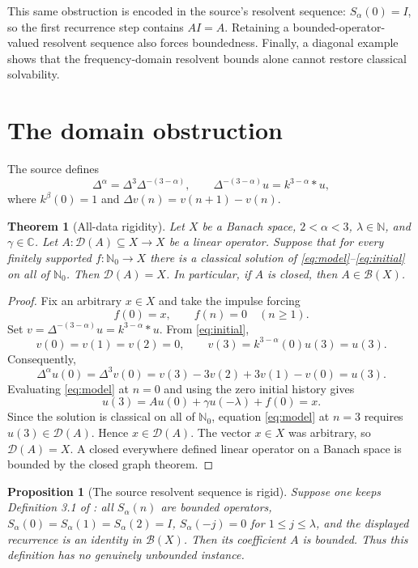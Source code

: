 \documentclass[11pt]{article}
\newtheorem{theorem}{Theorem}
\newtheorem{proposition}{Proposition}
\newcommand{\N}{\mathbb N}
\newcommand{\C}{\mathbb C}
\newcommand{\D}{\mathcal D}
\begin{document}
This same obstruction is encoded in the source's resolvent sequence:
$S_\alpha(0)=I$, so the first recurrence step contains $AI=A$. Retaining a
bounded-operator-valued resolvent sequence also forces boundedness. Finally,
a diagonal example shows that the frequency-domain resolvent bounds alone
cannot restore classical solvability.

\section{The domain obstruction}

The source defines
\[
 \Delta^\alpha=\Delta^3\Delta^{-(3-\alpha)},\qquad
 \Delta^{-(3-\alpha)}u=k^{3-\alpha}*u,
\]
where $k^\beta(0)=1$ and $\Delta v(n)=v(n+1)-v(n)$.

\begin{theorem}[All-data rigidity]\label{thm:rigidity}
Let $X$ be a Banach space, $2<\alpha<3$, $\lambda\in\N$, and
$\gamma\in\C$. Let $A:\D(A)\subseteq X\to X$ be a linear operator.
Suppose that for every finitely supported $f:\N_0\to X$ there is a classical
solution of \eqref{eq:model}--\eqref{eq:initial} on all of $\N_0$. Then
$\D(A)=X$. In particular, if $A$ is closed, then $A\in\mathcal B(X)$.
\end{theorem}

\begin{proof}
Fix an arbitrary $x\in X$ and take the impulse forcing
\[
 f(0)=x,\qquad f(n)=0\quad(n\ge1).
\]
Set $v=\Delta^{-(3-\alpha)}u=k^{3-\alpha}*u$. From
\eqref{eq:initial},
\[
 v(0)=v(1)=v(2)=0,\qquad v(3)=k^{3-\alpha}(0)u(3)=u(3).
\]
Consequently,
\[
 \Delta^\alpha u(0)=\Delta^3v(0)
 =v(3)-3v(2)+3v(1)-v(0)=u(3).
\]
Evaluating \eqref{eq:model} at $n=0$ and using the zero initial history gives
\[
 u(3)=Au(0)+\gamma u(-\lambda)+f(0)=x.
\]
Since the solution is classical on all of $\N_0$, equation
\eqref{eq:model} at $n=3$ requires $u(3)\in\D(A)$. Hence $x\in\D(A)$.
The vector $x\in X$ was arbitrary, so $\D(A)=X$. A closed everywhere
defined linear operator on a Banach space is bounded by the closed graph
theorem.
\end{proof}

\begin{proposition}[The source resolvent sequence is rigid]\label{prop:S}
Suppose one keeps Definition 3.1 of \cite{ZhangBu}: all
$S_\alpha(n)$ are bounded operators,
$S_\alpha(0)=S_\alpha(1)=S_\alpha(2)=I$,
$S_\alpha(-j)=0$ for $1\le j\le\lambda$, and the displayed recurrence is an
identity in $\mathcal B(X)$. Then its coefficient $A$ is bounded. Thus this
definition has no genuinely unbounded instance.
\end{proposition}
\end{document}
